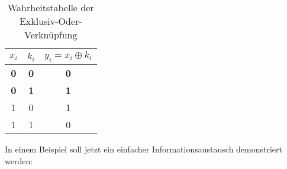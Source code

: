 \begin{table}
  \centering
  \caption{Wahrheitstabelle der Exklusiv-Oder-Verknüpfung}
  \begin{tabular}{cc|c}
    $x_i$      & $k_i$      & $y_i = x_i \oplus k_i$ \\ \hline
    \textbf{0} & \textbf{0} & \textbf{0}             \\
    \textbf{0} & \textbf{1} & \textbf{1}             \\
    1          & 0          & 1                      \\
    1          & 1          & 0                      \\
  \end{tabular}
  \label{tab:truth-table-xor}
\end{table}



\noindent
In einem Beispiel soll jetzt ein einfacher Informationsaustausch demonstriert werden:

\newcommand{\streamencryption}{
  \begin{aligned}
    x_0,\dots,x_7 = 01010 & 000_2 = 80_{10} = \text{\texttt{P}}  \\
    \oplus                &                                      \\
    k_0,\dots,k_7 = 00111 & 010_2                                \\
    y_0,\dots,y_7 = 01101 & 010_2 = 106_{10} = \text{\texttt{j}}
  \end{aligned}
}

\newcommand{\streamdecryption}{
  \begin{aligned}
    y_0,\dots,y_7 = 01101 & 010_2 = 106_{10} = \text{\texttt{j}} \\
    \oplus                &                                      \\
    k_0,\dots,k_7 = 00111 & 010_2                                \\
    x_0,\dots,x_7 = 01010 & 000_2 = 80_{10} = \text{\texttt{P}}
  \end{aligned}
}

\newcommand{\streamarrow}{\tikz{\draw[->] (0,0) to
    node[above] {$\text{\texttt{j}} = 01101010_2$} (2,0);}}

